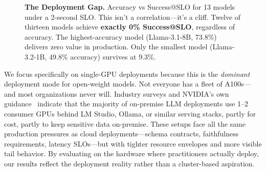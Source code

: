 \documentclass[11pt]{article}
\begin{document}
\begin{figure}[t]
\centering
{}
\caption{\textbf{The Deployment Gap.} Accuracy vs Success@SLO for 13 models under a 2-second SLO. This isn't a correlation---it's a cliff. Twelve of thirteen models achieve \textbf{exactly 0\% Success@SLO}, regardless of accuracy. The highest-accuracy model (Llama-3.1-8B, 73.8\%) delivers zero value in production. Only the smallest model (Llama-3.2-1B, 49.8\% accuracy) survives at 9.3\%.}
\label{fig:deployment-gap}
\end{figure}

We focus specifically on single-GPU deployments because this is the \emph{dominant} deployment mode for open-weight models.
Not everyone has a fleet of A100s---and most organizations never will.
Industry surveys and NVIDIA's own guidance~\citep{nvidia2025slm} indicate that the majority of on-premise LLM deployments use 1--2 consumer GPUs behind LM Studio, Ollama, or similar serving stacks, partly for cost, partly to keep sensitive data on-premise.
These setups face all the same production pressures as cloud deployments---schema contracts, faithfulness requirements, latency SLOs---but with tighter resource envelopes and more visible tail behavior.
By evaluating on the hardware where practitioners actually deploy, our results reflect the deployment reality rather than a cluster-based aspiration.
\end{document}
